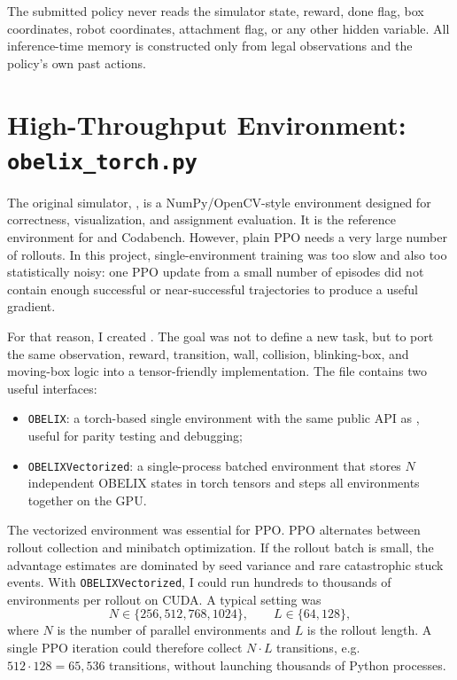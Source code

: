 \documentclass[11pt]{article}
\begin{document}
The submitted policy never reads the simulator state, reward, done flag, box
coordinates, robot coordinates, attachment flag, or any other hidden variable. All
inference-time memory is constructed only from legal observations and the policy's own
past actions.

\section{High-Throughput Environment: \texttt{obelix\_torch.py}}

The original simulator, , is a NumPy/OpenCV-style environment designed
for correctness, visualization, and assignment evaluation. It is the reference
environment for  and Codabench. However, plain PPO needs a very large
number of rollouts. In this project, single-environment training was too slow and also
too statistically noisy: one PPO update from a small number of episodes did not contain
enough successful or near-successful trajectories to produce a useful gradient.

For that reason, I created . The goal was not to define a new task,
but to port the same observation, reward, transition, wall, collision, blinking-box, and
moving-box logic into a tensor-friendly implementation. The file contains two useful
interfaces:
\begin{itemize}[leftmargin=1.5em]
  \item \texttt{OBELIX}: a torch-based single environment with the same public API as
  , useful for parity testing and debugging;
  \item \texttt{OBELIXVectorized}: a single-process batched environment that stores
  \(N\) independent OBELIX states in torch tensors and steps all environments together
  on the GPU.
\end{itemize}

The vectorized environment was essential for PPO. PPO alternates between rollout
collection and minibatch optimization. If the rollout batch is small, the advantage
estimates are dominated by seed variance and rare catastrophic stuck events. With
\texttt{OBELIXVectorized}, I could run hundreds to thousands of environments per
rollout on CUDA. A typical setting was
\[
  N\in\{256,512,768,1024\},
  \qquad
  L\in\{64,128\},
\]
where \(N\) is the number of parallel environments and \(L\) is the rollout length. A
single PPO iteration could therefore collect \(N\cdot L\) transitions, e.g.
\(512\cdot128=65{,}536\) transitions, without launching thousands of Python processes.
\end{document}
